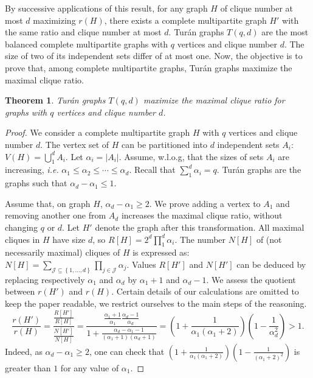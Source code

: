 \documentclass{article}
\newtheorem{theorem}{Theorem}
\newcommand{\set}[1]{\left\{ #1 \right\}}
\newcommand{\card}[1]{\left| #1 \right|}
\begin{document}
By successive applications of this result, for any graph $H$ of clique number at most $d$ maximizing $r(H)$, there exists a complete multipartite graph $H'$ with the same ratio and clique number at most $d$. 
Tur\'an graphs $T(q,d)$ are the most balanced complete multipartite graphs with $q$ vertices and clique number $d$. The size of two of its independent sets differ of at most one. Now, the objective is to prove that, among complete multipartite graphs, Tur\'an graphs maximize the maximal clique ratio.

\begin{theorem}
Tur\'an graphs $T(q,d)$ maximize the maximal clique ratio for graphs with $q$ vertices and clique number $d$.
\label{th:turan}
\end{theorem}
\begin{proof}
We consider a complete multipartite graph $H$ with $q$ vertices and clique number $d$. The vertex set of $H$ can be partitioned into $d$ independent sets $A_i$: $V(H) = \bigcup_1^d A_i$. Let $\alpha_i = \card{A_i}$. Assume, w.l.o.g, that the sizes of sets $A_i$ are increasing, {\em i.e.} $\alpha_1 \le \alpha_2 \le \cdots \le \alpha_d$. Recall that $\sum_1^d \alpha_i = q$. Tur\'an graphs are the graphs such that $\alpha_d - \alpha_1 \le 1$.

Assume that, on graph $H$, $\alpha_d - \alpha_1 \ge 2$. We prove adding a vertex to $A_1$ and removing another one from $A_d$ increases the maximal clique ratio, without changing $q$ or $d$. Let $H'$ denote the graph after this transformation. All maximal cliques in $H$ have size $d$, so $R\left[ H\right] = 2^d \prod_1^d \alpha_i$. The number $N\left[ H\right]$ of (not necessarily maximal) cliques of $H$ is expressed as: $N\left[ H\right] = \sum\limits_{\mathcal{J} \subseteq \set{1,\ldots,d}} \prod_{j \in \mathcal{J}} \alpha_j$. Values $R\left[ H'\right]$ and $N\left[ H'\right]$ can be deduced by replacing respectively $\alpha_1$ and $\alpha_d$ by $\alpha_1 + 1$ and $\alpha_d-1$. We assess the quotient between $r(H')$ and $r(H)$. Certain details of our calculations are omitted to keep the paper readable, we restrict ourselves to the main steps of the reasoning. 
\[
\frac{r(H')}{r(H)} = \frac{\frac{R\left[ H'\right]}{R\left[ H\right]}}{\frac{N\left[ H'\right]}{N\left[ H\right]}} = \frac{\frac{\alpha_1+1}{\alpha_1}\frac{\alpha_d-1}{\alpha_d}}{1+\frac{\alpha_d-\alpha_1-1}{(\alpha_1+1)(\alpha_d+1)}} = \left(1+\frac{1}{\alpha_1(\alpha_1+2)}\right)\left(1-\frac{1}{\alpha_d^2}\right) >  1.
\]
Indeed, as $\alpha_d - \alpha_1 \ge 2$, one can check that $\left(1+\frac{1}{\alpha_1(\alpha_1+2)}\right)\left(1-\frac{1}{(\alpha_1+2)^2}\right)$ is greater than $1$ for any value of $\alpha_1$.
\end{proof}
\end{document}
